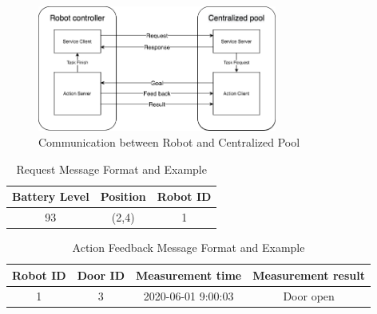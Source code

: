 \begin{figure}[htbp]
    \centering
    \includegraphics[width = 0.7\textwidth]{content/images/ch4/robot_pool_comminication.drawio.png}
    \caption{Communication between Robot and Centralized Pool}
    \label{fig:communication_robot_pool}
\end{figure}

\begin{table}[htb]
\centering
\begin{tabular}{|c|c|c|} 
\hline
Battery Level & Position & Robot ID\\
\hline\hline
93	&(2,4)	&1 \\ [1ex] 
\hline
\end{tabular}
\caption{Request Message Format and Example}
\label{tab:request_message}
\end{table}

\begin{table}[htb]
\centering
{}
\caption{Action Goal Message Format and Example}
\label{tab:goal_message}
\end{table}

\begin{table}[htb]
\centering
\begin{tabular}{|c|c|c|c|} 
\hline
Robot ID & Door ID & Measurement time & Measurement result \\
\hline\hline
1	& 3	& 2020-06-01 9:00:03 & Door open \\ [1ex] 
\hline
\end{tabular}
\caption{Action Feedback Message Format and Example}
\label{tab:feedback_message}
\end{table}

